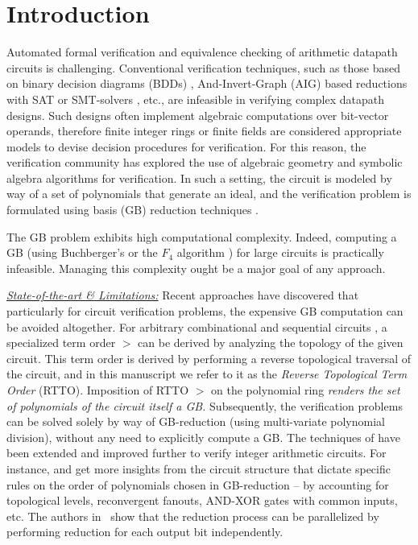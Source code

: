 \section{Introduction}

Automated formal verification and equivalence checking of arithmetic
datapath circuits is challenging. Conventional verification
techniques, such as those based on binary  decision diagrams (BDDs)
\cite{BRYA86}, And-Invert-Graph (AIG) based reductions with SAT or
SMT-solvers \cite{alanmi:cec:iccad2006}, etc., are infeasible in
verifying complex datapath designs. Such designs often implement
algebraic computations over bit-vector operands, therefore finite
integer rings \cite{wienand:cav08} or finite fields \cite{pruss:tcad}
are considered appropriate models to devise decision
procedures for verification. For this reason, the verification
community has explored the use of algebraic geometry and symbolic
algebra algorithms for verification. In such a setting, the circuit is
modeled by way of a set of polynomials that generate an ideal, and the
verification problem is formulated using \Grobner basis (GB) reduction techniques \cite{gb_book}. 

The GB problem exhibits high computational complexity. 
Indeed, computing a GB (using Buchberger's
\cite{buchberger_thesis} or the $F_4$ algorithm \cite{f4}) for large
circuits is practically infeasible. Managing this complexity ought be
a major goal of any approach.

\underline{\it State-of-the-art \& Limitations:} Recent
approaches \cite{wienand:cav08} \cite{lv:tcad2013} have discovered that
particularly for circuit verification problems, the expensive GB
computation can be avoided altogether. For arbitrary combinational
\cite{wienand:cav08} \cite{lv:tcad2013} and sequential circuits
\cite{xiaojun:hldvt2016}, a specialized term order 
$>$ can be derived by analyzing the topology of the given 
circuit. This term order is derived by performing a reverse
topological traversal of the circuit, and in this manuscript we refer
to it as the {\it Reverse Topological Term Order} (RTTO). 
Imposition of RTTO $>$ on the polynomial ring
{\it renders the set of polynomials of the circuit itself a
GB.} Subsequently, the verification problems can be solved solely by
way of GB-reduction (using multi-variate polynomial division), without
any need to explicitly compute a GB. The techniques of
\cite{wienand:cav08} \cite{lv:tcad2013} have been extended and
improved further to verify integer arithmetic circuits. For instance,
\cite{ciesielski:dac2015} and \cite{rolf:date16} get more insights
from the circuit structure that  dictate specific rules on the order of
polynomials chosen in GB-reduction -- by accounting for topological
levels, reconvergent fanouts, AND-XOR gates with common inputs, etc. The authors in~\cite{cunxi:aspdac17} show that the
reduction process can be parallelized by performing reduction for each output bit independently. 

